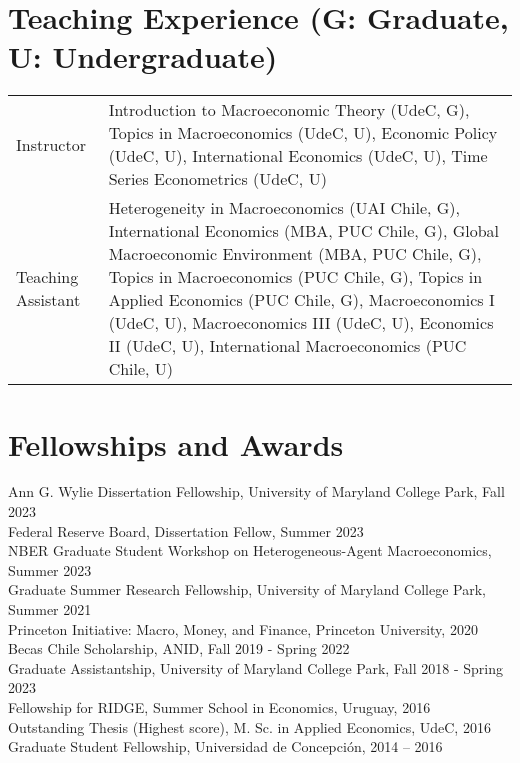 \documentclass[10pt]{article}
\begin{document}
\section*{Teaching Experience (\footnotesize G: Graduate, U: Undergraduate)}


\begin{tabular}{@{}lp{13cm}}
Instructor& Introduction to Macroeconomic Theory (UdeC, G), Topics in Macroeconomics (UdeC, U), Economic Policy (UdeC, U), International Economics (UdeC, U), Time Series Econometrics (UdeC, U)\\
Teaching Assistant& Heterogeneity in Macroeconomics (UAI Chile, G), International Economics (MBA, PUC Chile, G), Global Macroeconomic Environment (MBA, PUC Chile, G), Topics in Macroeconomics (PUC Chile, G), Topics in Applied Economics (PUC Chile, G), Macroeconomics I (UdeC, U), Macroeconomics III (UdeC, U), Economics II (UdeC, U), International Macroeconomics (PUC Chile, U)
\end{tabular}


\section*{Fellowships and Awards}
Ann G. Wylie Dissertation Fellowship, University of Maryland College Park, Fall 2023 \\
Federal Reserve Board, Dissertation Fellow, Summer 2023 \\
NBER Graduate Student Workshop on Heterogeneous-Agent Macroeconomics,  Summer 2023\\
Graduate Summer Research Fellowship, University of Maryland College Park, Summer 2021\\
Princeton Initiative: Macro, Money, and Finance, Princeton University, 2020\\
Becas Chile Scholarship, ANID, Fall 2019 - Spring 2022\\
Graduate Assistantship, University of Maryland College Park, Fall 2018 - Spring 2023\\
Fellowship for RIDGE, Summer School in Economics, Uruguay, 2016\\
Outstanding Thesis (Highest score), M. Sc. in Applied Economics, UdeC, 2016\\
Graduate Student Fellowship, Universidad de Concepci\'on, 2014 -- 2016
\end{document}
